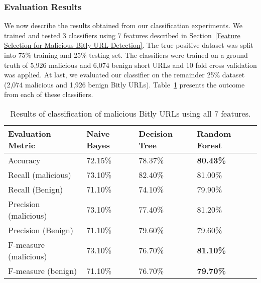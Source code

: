\documentclass[conference]{IEEEtran}
\begin{document}
\subsubsection{Evaluation Results}
We now describe the results obtained from our classification experiments. We trained and tested 3 classifiers using 7 features described in Section~\ref{Feature Selection for Malicious Bitly URL Detection}. The true positive dataset was split into 75\% training and 25\% testing set. The classifiers were trained on a ground truth of 5,926 malicious and 6,074 benign short URLs and 10 fold cross validation was applied. At last, we evaluated our classifier on the remainder 25\% dataset (2,074 malicious and 1,926 benign Bitly URLs). Table~\ref{classifierAllFeatures} presents the outcome from each of these classifiers. 
\begin{table}[h]
\small
\begin{center}
\begin{tabular}{|p{2.9cm}|p{1cm}|p{1cm}|p{1cm}|}
    \hline
    {\bf Evaluation Metric}     & {\bf Naive Bayes} & {\bf Decision Tree} & {\bf Random Forest} \\ \hline
    Accuracy              & 72.15\%     & 78.37\%       & \bf{80.43\%}       \\ \hline
    Recall (malicious)    & 73.10\%     & 82.40\%       & 81.00\%       \\ \hline
    Recall (Benign)       & 71.10\%     & 74.10\%       & 79.90\%       \\ \hline
    Precision (malicious) & 73.10\%     & 77.40\%       & 81.20\%       \\ \hline
    Precision (Benign)    & 71.10\%     & 79.60\%       & 79.60\%       \\ \hline
    F-measure (malicious) & 73.10\%     & 76.70\%       & \bf{81.10\%}       \\ \hline
    F-measure (benign)      & 71.10\%     & 76.70\%       & \bf{79.70}\%       \\ \hline
    \end{tabular}
    \caption {\label{classifierAllFeatures} Results of classification of malicious Bitly URLs using all 7 features.}
\end{center}
\end{table}
\end{document}
